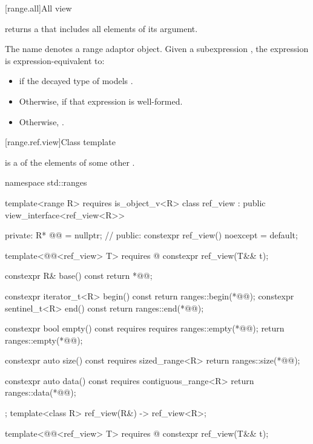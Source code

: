 [range.all]{All view}

\pnum
{} returns a  that includes all elements of
its  argument.

\pnum
The name  denotes a
range adaptor object.
Given a subexpression , the expression
 is expression-equivalent to:
\begin{itemize}
\item {} if the decayed type of 
models .

\item Otherwise,  if that expression is well-formed.

\item Otherwise, .
\end{itemize}

[range.ref.view]{Class template }

\pnum
{} is a  of the elements of some other .
%
\begin{codeblock}
namespace std::ranges {
  template<range R>
    requires is_object_v<R>
  class ref_view : public view_interface<ref_view<R>> {
  private:
    R* @@ = nullptr;            // \expos
  public:
    constexpr ref_view() noexcept = default;

    template<@@<ref_view> T>
      requires @\seebelow@
    constexpr ref_view(T&& t);

    constexpr R& base() const { return *@@; }

    constexpr iterator_t<R> begin() const { return ranges::begin(*@@); }
    constexpr sentinel_t<R> end() const { return ranges::end(*@@); }

    constexpr bool empty() const
      requires requires { ranges::empty(*@@); }
    { return ranges::empty(*@@); }

    constexpr auto size() const requires sized_range<R>
    { return ranges::size(*@@); }

    constexpr auto data() const requires contiguous_range<R>
    { return ranges::data(*@@); }
  };
  template<class R>
    ref_view(R&) -> ref_view<R>;
}
\end{codeblock}

%
\begin{itemdecl}
template<@@<ref_view> T>
  requires @\seebelow@
constexpr ref_view(T&& t);
\end{itemdecl}

